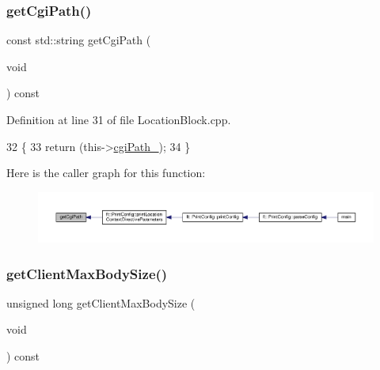 \subsubsection{\texorpdfstring{get\+Cgi\+Path()}{getCgiPath()}}
{\footnotesize\ttfamily const std\+::string get\+Cgi\+Path (\begin{DoxyParamCaption}\item[{void}]{ }\end{DoxyParamCaption}) const}



Definition at line 31 of file Location\+Block.\+cpp.


\begin{DoxyCode}
32     \{
33         \textcolor{keywordflow}{return} (this->\hyperlink{classft_1_1_location_block_a88189428cc92093d70626539b8851f5f}{cgiPath\_});
34     \}
\end{DoxyCode}
Here is the caller graph for this function\+:
\nopagebreak
\begin{figure}[H]
\begin{center}
\leavevmode
\includegraphics[width=350pt]{classft_1_1_location_block_a9f90dac2d6314b77ccb9c9d4ab2a3fa4_icgraph}
\end{center}
\end{figure}
\mbox{\label{classft_1_1_base_directives_a930398ba1e4b99b2ba01a60dcda0c923}} 
\subsubsection{\texorpdfstring{get\+Client\+Max\+Body\+Size()}{getClientMaxBodySize()}}
{\footnotesize\ttfamily unsigned long get\+Client\+Max\+Body\+Size (\begin{DoxyParamCaption}\item[{void}]{ }\end{DoxyParamCaption}) const\hspace{0.3cm}{\ttfamily [inherited]}}



